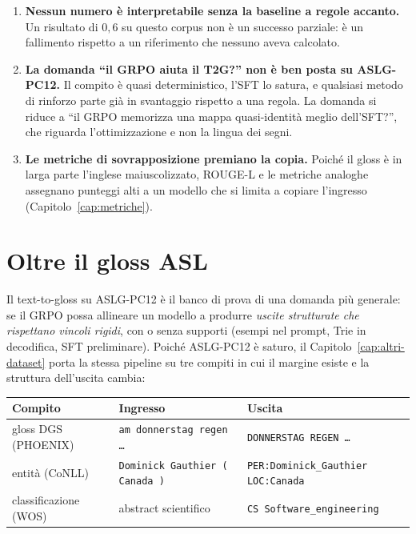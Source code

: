 \begin{enumerate}
  \item \textbf{Nessun numero è interpretabile senza la baseline a regole
        accanto.} Un risultato di $0{,}6$ su questo corpus non è un successo
        parziale: è un fallimento rispetto a un riferimento che nessuno aveva
        calcolato.
  \item \textbf{La domanda ``il GRPO aiuta il T2G?'' non è ben posta su
        ASLG-PC12.} Il compito è quasi deterministico, l'SFT lo satura, e
        qualsiasi metodo di rinforzo parte già in svantaggio rispetto a una
        regola. La domanda si riduce a ``il GRPO memorizza una mappa
        quasi-identità meglio dell'SFT?'', che riguarda l'ottimizzazione e non
        la lingua dei segni.
  \item \textbf{Le metriche di sovrapposizione premiano la copia.} Poiché il
        gloss è in larga parte l'inglese maiuscolizzato, ROUGE-L e le metriche
        analoghe assegnano punteggi alti a un modello che si limita a copiare
        l'ingresso (Capitolo~\ref{cap:metriche}).
\end{enumerate}

\section{Oltre il gloss ASL}

Il text-to-gloss su ASLG-PC12 è il banco di prova di una domanda più generale:
se il GRPO possa allineare un modello a produrre \emph{uscite strutturate che
rispettano vincoli rigidi}, con o senza supporti (esempi nel prompt, Trie in
decodifica, SFT preliminare). Poiché ASLG-PC12 è saturo, il
Capitolo~\ref{cap:altri-dataset} porta la stessa pipeline su tre compiti in cui
il margine esiste e la struttura dell'uscita cambia:

\begin{center}
\footnotesize
\begin{tabular}{lll}
\toprule
Compito & Ingresso & Uscita \\
\midrule
gloss DGS (PHOENIX) & \texttt{am donnerstag regen \dots} & \texttt{DONNERSTAG REGEN \dots} \\
entità (CoNLL) & \texttt{Dominick Gauthier ( Canada )} & \texttt{PER:Dominick\_Gauthier LOC:Canada} \\
classificazione (WOS) & abstract scientifico & \texttt{CS Software\_engineering} \\
\bottomrule
\end{tabular}
\end{center}

